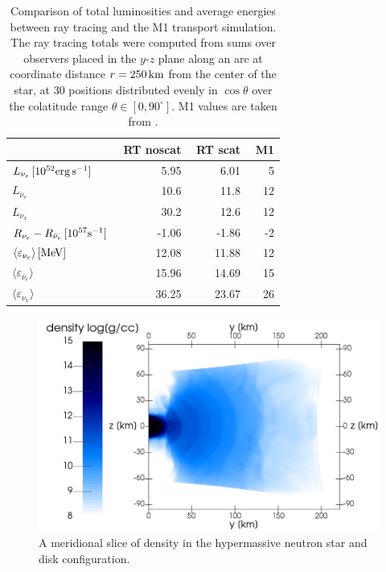 \documentclass[aps,floatfix,prd,superscriptaddress,twocolumn]{revtex4-1}
\begin{document}
\begin{table}%
  \caption{
    Comparison of total luminosities and average energies between
    ray tracing and the M1 transport simulation.
    The ray tracing totals were computed from sums over
    observers placed in the $y$-$z$ plane along an arc at coordinate distance
    $r=250\,{\rm km}$ from the center of the star, at 30 positions
    distributed evenly in $\cos\theta$ over the colatitude range
    $\theta\in[0,90^{\circ}]$.
    M1 values are taken from \cite[Figs. 7, 9, 10]{fouc2016-m1_evolve_n}.
  }
  \label{tab:nsns_rt_vs_m1}
  \begin{tabularx}{\columnwidth}{X r r r}
    & \,\,{\bf RT noscat} & \,\,{\bf RT scat} & \,\,{\bf M1} \\
    \hline
    $L_{\nu_e}\,[10^{52}{\rm erg}\,{\rm s}^{-1}]$        & 5.95 & 6.01 & 5 \\
    $L_{\bar{\nu}_e}$                                    & 10.6 & 11.8 & 12 \\
    $L_{\nu_x}$                                          & 30.2 & 12.6 & 12 \\
    \hline
    $R_{\nu_e}-R_{\bar{\nu}_e}\,[10^{57}{\rm s}^{-1}]$   & -1.06 & -1.86 & -2 \\
    \hline
    $\langle \varepsilon_{\nu_e} \rangle\,[{\rm MeV}]$   & 12.08 & 11.88 & 12 \\
    $\langle \varepsilon_{\bar{\nu}_e} \rangle$          & 15.96 & 14.69 & 15 \\
    $\langle \varepsilon_{\nu_x} \rangle$                & 36.25 & 23.67 & 26 \\
    \hline
  \end{tabularx}
\end{table}

\begin{figure}
  \includegraphics[width=\columnwidth]{production-colormap-merid-rho}
  \caption{A meridional slice of density in the hypermassive neutron
    star and disk configuration.}
  \label{fig:nsns_rho_merid}
\end{figure}
\end{document}
